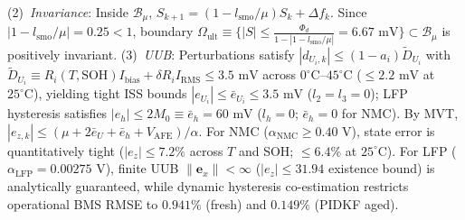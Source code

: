 \documentclass[balance,nocopyright,upint,varvw,hyphenate,barcolor=NavyBlue,nolists]{asmejour}
\begin{document}
(2)~\emph{Invariance}: Inside $\mathcal{B}_\mu$, $S_{k+1} = (1 - l_{\text{smo}}/\mu)S_k + \Delta f_k$. Since $|1 - l_{\text{smo}}/\mu| = 0.25 < 1$, boundary $\Omega_{\text{ult}} \equiv \{|S| \le \frac{\Phi_d}{1 - |1 - l_{\text{smo}}/\mu|} = 6.67\text{ mV}\} \subset \mathcal{B}_\mu$ is positively invariant. 
(3)~\emph{UUB}: Perturbations satisfy $|d_{U_i,k}| \le (1 - a_i)\tilde{D}_{U_i}$ with $\tilde{D}_{U_i} \equiv R_i(T,\text{SOH}) I_{\text{bias}} + \delta R_i I_{\text{RMS}} \le 3.5\text{ mV}$ across $0^\circ\text{C}\text{--}45^\circ\text{C}$ ($\le 2.2\text{ mV}$ at $25^\circ\text{C}$), yielding tight ISS bounds $|e_{U_i}| \le \bar{e}_{U_i} \le 3.5\text{ mV}$ ($l_2=l_3=0$); LFP hysteresis satisfies $|e_h| \le 2 M_0 \equiv \bar{e}_h = 60\text{ mV}$ ($l_h=0$; $\bar{e}_h = 0$ for NMC). By MVT, $|e_{z,k}| \le (\mu + 2\bar{e}_{U} + \bar{e}_h + V_{\text{AFE}})/\alpha$. For NMC ($\alpha_{\text{NMC}} \ge 0.40\text{ V}$), state error is quantitatively tight ($|e_z| \le 7.2\%$ across $T$ and SOH; $\le 6.4\%$ at $25^\circ\text{C}$). For LFP ($\alpha_{\text{LFP}} = 0.00275\text{ V}$), finite UUB $\|\mathbf{e}_x\| < \infty$ ($|e_z| \le 31.94$ existence bound) is analytically guaranteed, while dynamic hysteresis co-estimation restricts operational BMS RMSE to $0.941\%$ (fresh) and $0.149\%$ (PIDKF aged). 
\end{document}

